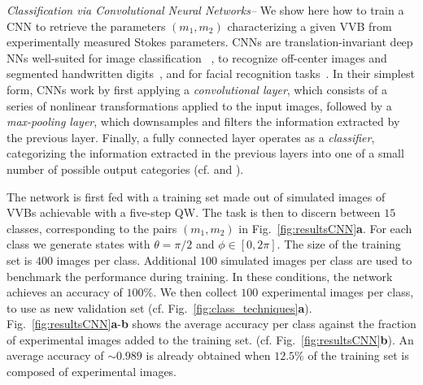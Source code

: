 \documentclass[
	aps, prl, superscriptaddress, twocolumn,
	10pt
	floatfix, 
    nofootinbib,
	tightenlines
]{revtex4-1}
\begin{document}
\textit{Classification via Convolutional Neural Networks--} We show here how to train a \ac{CNN}  to retrieve the parameters $(m_1,m_2)$ characterizing a given VVB from experimentally measured Stokes parameters.
\acp{CNN} are translation-invariant deep NNs well-suited for image classification ~\cite{lecun2015deep}, to recognize off-center images and segmented handwritten digits~\cite{Simard2003,Ciresan:2011:FHP:2283516.2283603},
and for facial recognition tasks~\cite{MATSUGU2003555}. 
In their simplest form, \acp{CNN} work by first applying a \emph{convolutional layer}, which consists of a series of nonlinear transformations applied to the input images, followed by a \emph{max-pooling layer}, which downsamples and filters the information extracted by the previous layer. Finally, a fully connected layer operates as a \emph{classifier}, categorizing the information extracted in the previous layers into one of a small number of possible output categories
(cf. \cite{SI} and ).
 
The network is first fed with a training set made out of simulated images of \ac{VVB}s achievable with a five-step \ac{QW}.
The task is then to discern between $15$ classes, corresponding to the pairs $(m_1,m_2)$ in Fig.~\ref{fig:resultsCNN}{\bf a}.
For each class we generate states with $\theta=\pi/2$ and $\phi\in[0,2\pi]$. The size of the training set is $400$ images per class. Additional $100$ simulated images per class are used to benchmark the performance during training. 
In these conditions, the network achieves an accuracy of $100\%$.
We then collect $100$ experimental images per class, to use as new validation set (cf. Fig.~\ref{fig:class_techniques}{\bf a}).
Fig.~\ref{fig:resultsCNN}{\bf a}-{\bf b} shows the average accuracy per class against the fraction of experimental images added to the training set.
(cf. Fig.~\ref{fig:resultsCNN}{\bf b}). An average accuracy of $\sim 0.989$ is already obtained when $12.5\%$ of the training set is composed of experimental images.
\end{document}
